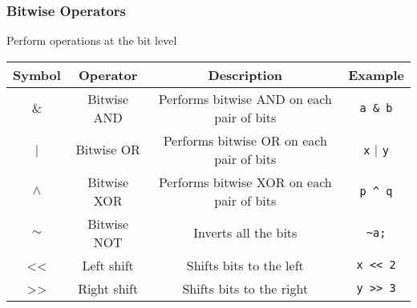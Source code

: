 \documentclass[11pt,A4]{article}
\begin{document}
            \subsubsection{Bitwise Operators}
            Perform operations at the bit level
            \begin{table}[h]
                \centering
                \setlength{\arrayrulewidth}{0.3mm}
                \renewcommand{\arraystretch}{1.2}
                \begin{tabular}{cccc}
                    \toprule
                    Symbol & Operator & Description & Example \\
                    \midrule
                    \& & Bitwise AND & Performs bitwise AND on each pair of bits & \verb|a & b| \\
                    \arrayrulecolor{gray!50}\cmidrule(lr){1-4}\arrayrulecolor{black}
                    | & Bitwise OR & Performs bitwise OR on each pair of bits & \verb|x| | \verb|y| \\
                    \arrayrulecolor{gray!50}\cmidrule(lr){1-4}\arrayrulecolor{black}
                    $\wedge$ & Bitwise XOR & Performs bitwise XOR on each pair of bits & \verb|p ^ q| \\
                    \arrayrulecolor{gray!50}\cmidrule(lr){1-4}\arrayrulecolor{black}
                    $\sim$ & Bitwise NOT & Inverts all the bits & \verb|~a;| \\
                    \arrayrulecolor{gray!50}\cmidrule(lr){1-4}\arrayrulecolor{black}
                    << & Left shift & Shifts bits to the left & \verb|x << 2| \\
                    \arrayrulecolor{gray!50}\cmidrule(lr){1-4}\arrayrulecolor{black}
                    >> & Right shift & Shifts bits to the right & \verb|y >> 3| \\
                    \bottomrule
                \end{tabular}
            \end{table}  \\ 
            
\end{document}
